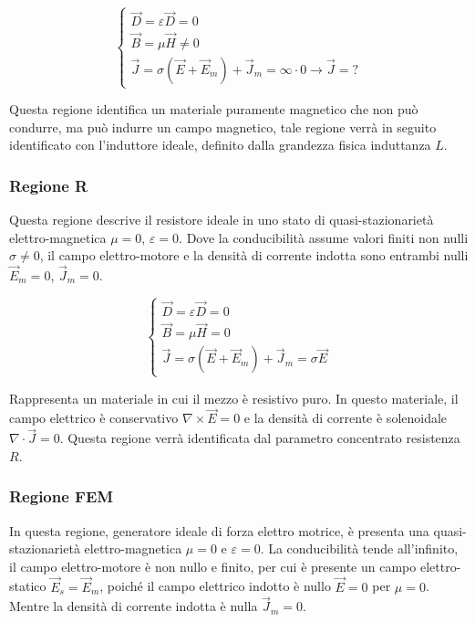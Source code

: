 \documentclass{article}
\numberwithin{equation}{subsection}
\begin{document}
\begin{equation*}
    \begin{cases}
        \vec{D}=\varepsilon\vec{D}=0\\
        \vec{B}=\mu\vec{H}\neq0\\
        \vec{J}=\sigma(\vec{E}+\vec{E}_m)+\vec{J}_m=\infty\cdot0\to\vec{J}=?
    \end{cases}
\end{equation*}

Questa regione identifica un materiale puramente magnetico che non può condurre, ma può indurre un campo magnetico, tale regione verrà in seguito identificato con l'induttore ideale, 
definito dalla grandezza fisica induttanza $L$. 

\subsubsection{Regione R}

Questa regione descrive il resistore ideale in uno stato di quasi-stazionarietà elettro-magnetica $\mu=0$, $\varepsilon=0$. Dove la conducibilità assume valori 
finiti non nulli $\sigma\neq0$, il campo elettro-motore e la densità di corrente indotta sono entrambi nulli $\vec{E}_m=0$, $\vec{J}_m=0$.

\begin{equation*}
    \begin{cases}
        \vec{D}=\varepsilon\vec{D}=0\\
        \vec{B}=\mu\vec{H}=0\\
        \vec{J}=\sigma(\vec{E}+\vec{E}_m)+\vec{J}_m=\sigma\vec{E}
    \end{cases}
\end{equation*}

Rappresenta un materiale in cui il mezzo è resistivo puro. In questo materiale, il campo elettrico è conservativo $\nabla\times\vec{E}=0$ e la densità di corrente è solenoidale 
$\nabla\cdot\vec{J}=0$. Questa regione verrà identificata dal parametro concentrato resistenza $R$. 

\subsubsection{Regione FEM}

In questa regione, generatore ideale di forza elettro motrice, è presenta una quasi-stazionarietà elettro-magnetica $\mu=0$ e $\varepsilon=0$. La conducibilità tende all'infinito, 
il campo elettro-motore è non nullo e finito, per cui è presente un campo elettro-statico $\vec{E}_s=\vec{E}_m$, poiché il campo elettrico indotto è nullo $\vec{E}=0$ per 
$\mu=0$. Mentre la densità di corrente indotta è nulla $\vec{J}_m=0$. 
\end{document}
